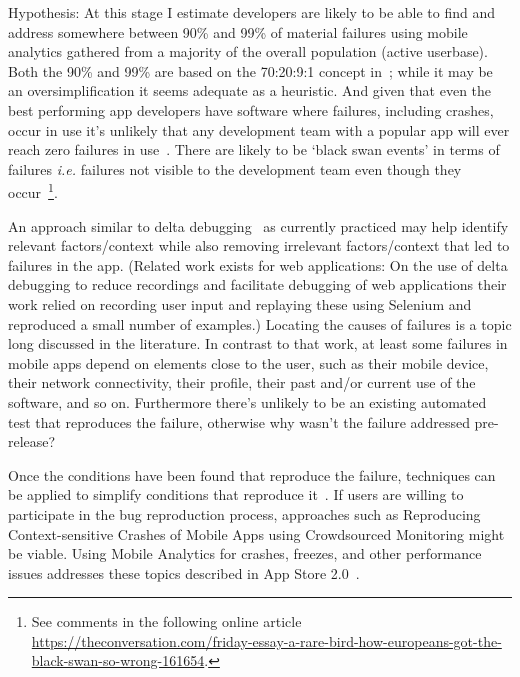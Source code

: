 Hypothesis: At this stage I estimate developers are likely to be able to find and address somewhere between 90\% and 99\% of material failures using mobile analytics gathered from a majority of the overall population (active userbase). Both the 90\% and 99\% are based on the 70:20:9:1 concept in~; while it may be an oversimplification it seems adequate as a heuristic. And given that even the best performing app developers have software where failures, including crashes, occur in use it's unlikely that any development team with a popular app will ever reach zero failures in use~. There are likely to be `black swan events' in terms of failures \emph{i.e.} failures not visible to the development team even though they occur~\footnote{See comments in the following online article \url{https://theconversation.com/friday-essay-a-rare-bird-how-europeans-got-the-black-swan-so-wrong-161654}.}.


An approach similar to delta debugging~ as currently practiced may help identify relevant factors/context while also removing irrelevant factors/context that led to failures in the app. (Related work exists for web applications: On the use of delta debugging to reduce recordings and facilitate debugging of web applications their work relied on recording user input and replaying these using Selenium and reproduced a small number of examples.) Locating the causes of failures is a topic long discussed in the literature. In contrast to that work, at least some failures in mobile apps depend on elements close to the user, such as their mobile device, their network connectivity, their profile, their past and/or current use of the software, and so on. Furthermore there’s unlikely to be an existing automated test that reproduces the failure, otherwise why wasn't the failure addressed pre-release?

Once the conditions have been found that reproduce the failure, techniques can be applied to simplify conditions that reproduce it~. If users are willing to participate in the bug reproduction process, approaches such as Reproducing Context-sensitive Crashes of Mobile Apps using Crowdsourced Monitoring might be viable. Using Mobile Analytics for crashes, freezes, and other performance issues addresses these topics described in App Store 2.0~. 

